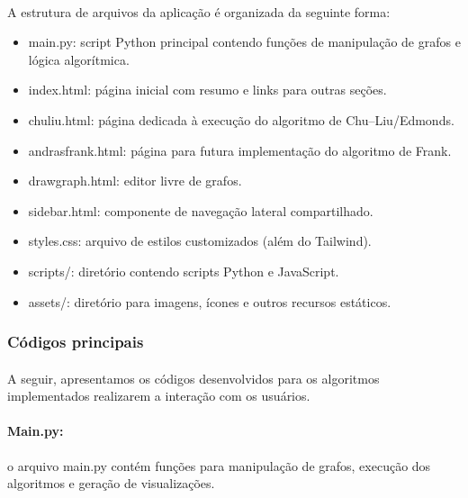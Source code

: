 \documentclass[12pt,a4paper]{article}
\def\texttt#1{#1}%
\def\_{}%
\begin{document}
\paragraph{}
A estrutura de arquivos da aplicação é organizada da seguinte forma:
\begin{itemize}\setlength{\itemsep}{2pt}
    \item \texttt{main.py}: script Python principal contendo funções de manipulação de grafos e lógica algorítmica.
    \item \texttt{index.html}: página inicial com resumo e links para outras seções.
    \item \texttt{chuliu.html}: página dedicada à execução do algoritmo de Chu--Liu/Edmonds.
    \item \texttt{andrasfrank.html}: página para futura implementação do algoritmo de Frank.
    \item \texttt{draw\_graph.html}: editor livre de grafos.
    \item \texttt{sidebar.html}: componente de navegação lateral compartilhado.
    \item \texttt{styles.css}: arquivo de estilos customizados (além do Tailwind).
    \item \texttt{scripts/}: diretório contendo scripts Python e JavaScript.
    \item \texttt{assets/}: diretório para imagens, ícones e outros recursos estáticos.
\end{itemize}

\subsubsection{Códigos principais}
\paragraph{}
A seguir, apresentamos os códigos desenvolvidos para os algoritmos implementados realizarem a interação com os usuários.

\paragraph{\texttt{Main.py}:} o arquivo \texttt{main.py} contém funções para manipulação de grafos, execução dos algoritmos e geração de visualizações.
\end{document}
